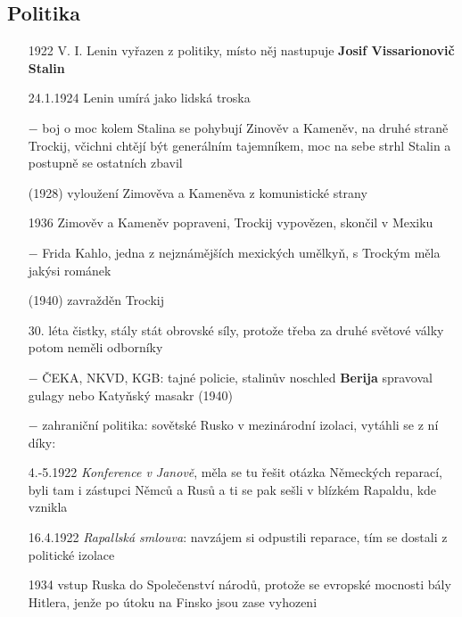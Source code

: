 \documentclass{article}
\begin{document}
\subsection*{Politika}
\begin{itemize}
    \vspace{-0.5em}
    \setlength\itemsep{0.15em}
    \item[1922] V. I. Lenin vyřazen z politiky, místo něj nastupuje \textbf{Josif Vissarionovič Stalin}
    \item[24.1.1924] Lenin umírá jako lidská troska
    \item[$-$] boj o moc kolem Stalina se pohybují Zinověv a Kameněv, na druhé straně Trockij, včichni chtějí být generálním tajemníkem, moc na sebe strhl Stalin a postupně se ostatních zbavil
    \item[(1928)] vyloužení Zimověva a Kameněva z komunistické strany
    \item[1936] Zimověv a Kameněv popraveni, Trockij vypovězen, skončil v Mexiku
    \item[$-$] Frida Kahlo, jedna z nejznámějších mexických umělkyň, s Trockým měla jakýsi románek
    \item[(1940)] zavražděn Trockij
    \item[30. léta] čistky, stály stát obrovské síly, protože třeba za druhé světové války potom neměli odborníky
    \item[$-$] ČEKA, NKVD, KGB: tajné policie, stalinův noschled \textbf{Berija} spravoval gulagy nebo Katyňský masakr (1940)
    \item[$-$] zahraniční politika: sovětské Rusko v mezinárodní izolaci, vytáhli se z ní díky:
    \item[4.-5.1922] \textit{Konference v Janově}, měla se tu řešit otázka Německých reparací, byli tam i zástupci Němců a Rusů a ti se pak sešli v blízkém Rapaldu, kde vznikla
    \item[16.4.1922] \textit{Rapallská smlouva}: navzájem si odpustili reparace, tím se dostali z politické izolace
    \item[1934] vstup Ruska do Společenství národů, protože se evropské mocnosti bály Hitlera, jenže po útoku na Finsko jsou zase vyhozeni   
\end{itemize}
\end{document}

